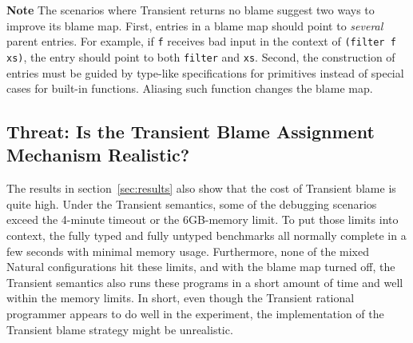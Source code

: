 {\bf Note} The scenarios where Transient returns no blame suggest two ways to
improve its blame map.  First, entries in a blame map should point to {\em
several\/} parent entries.  For example, if \texttt{f} receives bad input in the
context of {\tt (filter f xs)}, the entry should point to both \texttt{filter}
and \texttt{xs}. Second, the construction of entries must be guided by type-like
specifications for primitives instead of special cases for built-in
functions. Aliasing such function changes the blame map.  


\subsection{Threat: Is the Transient Blame Assignment Mechanism Realistic?}
\label{sec:threat:transient2}

The results in section~\ref{sec:results} also show that the cost of Transient
blame is quite high. Under the Transient semantics, some of the debugging
scenarios exceed the 4-minute timeout or the 6GB-memory limit. To put those
limits into context, the fully typed and fully untyped benchmarks all normally complete
in a few seconds with minimal memory usage. Furthermore, none of the mixed
Natural configurations hit these limits, and with the blame map turned off,
the Transient semantics also runs these programs in a short amount of time and
well within the memory limits. In short, even though the Transient rational
programmer appears to do well in the experiment, the implementation of the
Transient blame strategy might be unrealistic. 

